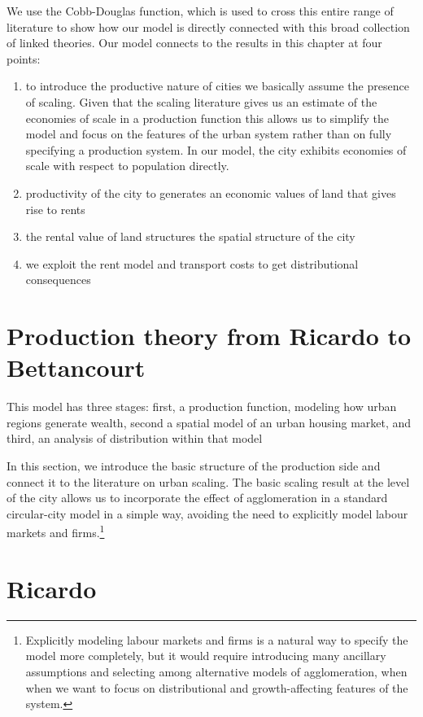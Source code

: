 We use the Cobb-Douglas function, which is used to cross this entire range of literature to show how our  model is directly connected with this broad collection of linked theories. Our model connects to the results in this chapter at four points:
\begin{enumerate}
    \item to introduce  the productive nature of cities we basically assume the presence of scaling. Given  that the scaling literature gives us an estimate of the economies of scale in a production function this allows us to simplify the model and focus on the features of the urban system rather than on fully specifying a production system. In our model, the city  exhibits economies of scale with respect to population directly. 

     \item  productivity of the city to generates an economic values of land that gives rise to rents

    \item  the rental value of land structures the spatial structure of the city

    \item we exploit the rent model and transport costs to get  distributional consequences
\end{enumerate}


\section{Production theory from Ricardo to Bettancourt}
This model has three stages: first, a production function, modeling how urban regions generate wealth,  second a spatial model of an urban housing market, and third, an analysis of distribution within that model 

In this section, we introduce the basic structure of the production side and connect it to the literature on urban scaling. The basic scaling result at the level of the city allows us to incorporate the effect of agglomeration in a standard  circular-city model in a simple way, avoiding the need to explicitly model labour markets and firms.\footnote{Explicitly modeling labour markets and firms is a natural way to specify the model more completely, but it would require introducing many ancillary assumptions and selecting among alternative models of agglomeration, when when we want to focus on distributional and growth-affecting features of the system.}


 \section{Ricardo}



